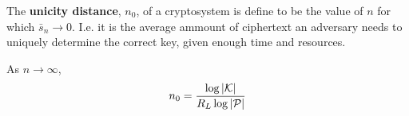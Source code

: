 \begin{definition}
    The \textbf{unicity distance}, $n_0$, of a cryptosystem is define to be the
    value of $n$ for which  $\bar{s}_n \rightarrow 0$. I.e. it is the average
    ammount of ciphertext an adversary needs to uniquely determine the correct
    key, given enough time and resources.
\end{definition}

\begin{lemma}\label{2.3.3}
    As $n \rightarrow \infty$,
    \begin{equation}
        n_0=\frac{\log{|\mathcal{K}|}}{R_L\log{|\mathcal{P}|}}
    \end{equation}
\end{lemma}
